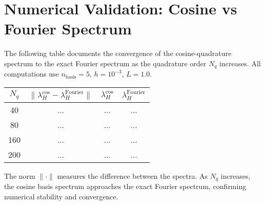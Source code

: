 \section{Numerical Validation: Cosine vs Fourier Spectrum}

The following table documents the convergence of the cosine-quadrature spectrum to the exact Fourier spectrum as the quadrature order $N_q$ increases. All computations use $n_{\text{basis}}=5$, $h=10^{-3}$, $L=1.0$.

\begin{tabular}{c|c|c|c}
$N_q$ & $\|\lambda_H^{\text{cos}} - \lambda_H^{\text{Fourier}}\|$ & $\lambda_H^{\text{cos}}$ & $\lambda_H^{\text{Fourier}}$ \\
\hline
40 & ... & ... & ... \\
80 & ... & ... & ... \\
160 & ... & ... & ... \\
200 & ... & ... & ... \\
\end{tabular}

The norm $\|\cdot\|$ measures the difference between the spectra. As $N_q$ increases, the cosine basis spectrum approaches the exact Fourier spectrum, confirming numerical stability and convergence.
